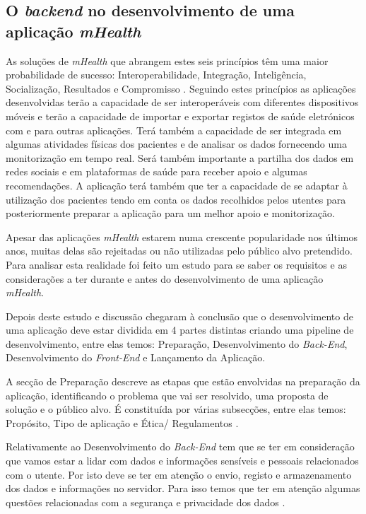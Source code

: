 \subsection{O \textit{backend} no desenvolvimento de uma aplica\c c\~ao \textit{mHealth}}
As solu\c c\~oes de \textit{mHealth} que abrangem estes seis princ\'ipios t\^em uma maior probabilidade de sucesso: Interoperabilidade, Integra\c c\~ao, Intelig\^encia, Socializa\c c\~ao, Resultados e Compromisso \cite{mhealthinsights}. Seguindo estes princípios as aplicações desenvolvidas terão a capacidade de ser interoperáveis com diferentes dispositivos móveis e terão a capacidade de importar e exportar registos de saúde eletrónicos com e para outras aplicações. Terá também a capacidade de ser integrada em algumas atividades físicas dos pacientes e de analisar os dados fornecendo uma monitorização em tempo real. Será também importante a partilha dos dados em redes sociais e em plataformas de saúde para receber apoio e algumas recomendações. A aplicação terá também que ter a capacidade de se adaptar à utilização dos pacientes tendo em conta os dados recolhidos pelos utentes para posteriormente preparar a aplicação para um melhor apoio e monitorização\cite{mhealthinsights}.
\par
Apesar das aplica\c c\~oes \textit{mHealth} estarem numa crescente popularidade nos \'ultimos anos, muitas delas s\~ao rejeitadas ou n\~ao utilizadas pelo p\'ublico alvo pretendido. Para analisar esta realidade foi feito um estudo para se saber os requisitos e as considera\c c\~oes a ter durante e antes do desenvolvimento de uma aplica\c c\~ao \textit{mHealth}\cite{mhealth-pipeline}.
\par
Depois deste estudo e discuss\~ao chegaram \`a conclus\~ao que o desenvolvimento de uma aplica\c c\~ao deve estar dividida em 4 partes distintas criando uma pipeline de desenvolvimento, entre elas temos:  Prepara\c c\~ao, Desenvolvimento do \textit{Back-End}, Desenvolvimento do \textit{Front-End} e Lan\c camento da Aplica\c c\~ao\cite{mhealth-pipeline}. \par 
A secção de Preparação descreve as etapas que estão envolvidas na preparação da aplicação, identificando o problema que vai ser resolvido, uma proposta de solução e o público alvo. É constituída por várias subsecções, entre elas temos: Propósito, Tipo de aplicação e Ética/ Regulamentos \cite{mhealth-pipeline}. 
\par 
Relativamente ao Desenvolvimento do \textit{Back-End} tem que se ter em consideração que vamos estar a lidar com dados e informações sensíveis e pessoais relacionados com o utente. Por isto deve se ter em atenção o envio, registo e armazenamento dos dados e informações no servidor. Para isso temos que ter em atenção algumas questões relacionadas com a segurança e privacidade dos dados \cite{mhealth-pipeline}.
